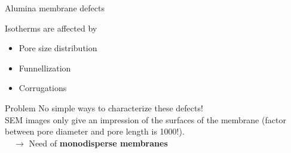 \documentclass[../defence.tex]{subfiles}
\begin{document}
  \begin{frame}{Alumina membrane defects}
    \begin{block}{Isotherms are affected by}
      \begin{itemize}
        \item Pore size distribution
        \item Funnellization
        \item Corrugations
      \end{itemize}
    \end{block}
    \pause

    \begin{alertblock}{Problem}
      No simple ways to characterize these defects!\\
      SEM images only give an impression of the surfaces of the membrane (factor between pore diameter and pore length is 1000!).\\
      $\quad\rightarrow$ Need of \textbf{monodisperse membranes}
    \end{alertblock}
  \end{frame}
\end{document}
